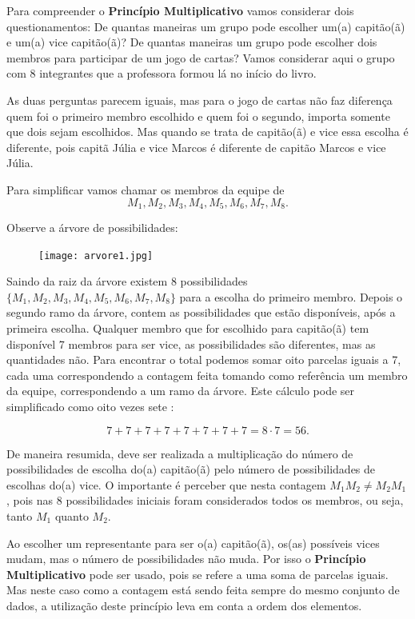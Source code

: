 Para compreender o \textbf{Princípio Multiplicativo} vamos considerar dois questionamentos: De quantas maneiras um grupo pode escolher um(a) capitão(ã) e um(a) vice capitão(ã)? De quantas maneiras um grupo pode escolher dois membros para participar de um jogo de cartas? Vamos considerar aqui o grupo com 8 integrantes que a professora formou lá no início do livro. 

As duas perguntas parecem iguais, mas para o jogo de cartas não faz diferença quem foi o primeiro membro escolhido e quem foi o segundo, importa somente que dois sejam escolhidos. Mas quando se trata de capitão(ã) e vice essa escolha é diferente, pois capitã Júlia e vice Marcos é diferente de capitão Marcos e vice Júlia. 

Para simplificar vamos chamar os membros da equipe de 
$$M_1, M_2, M_3, M_4, M_5, M_6, M_7, M_8.$$

Observe a árvore de possibilidades: 


\begin{figure}[H]
\centering

    \texttt{[image: arvore1.jpg]}
\end{figure}


Saindo da raiz da árvore existem 8 possibilidades $\{M_1, M_2, M_3, M_4, M_5, M_6, M_7, M_8\}$ para a escolha do primeiro membro. Depois o segundo ramo da árvore, contem as possibilidades que estão disponíveis, após a primeira escolha. Qualquer membro que for escolhido para capitão(ã) tem disponível 7 membros para ser vice, as possibilidades são diferentes, mas as quantidades não. Para encontrar o total podemos somar oito parcelas iguais a 7, cada uma correspondendo a contagem feita tomando como referência um membro da equipe, correspondendo a um ramo da árvore. Este cálculo pode ser simplificado como oito vezes sete :

$$7+7+7+7+7+7+7+7=  8 \cdot 7= 56.$$

De maneira resumida, deve ser realizada a multiplicação do número de possibilidades de escolha do(a) capitão(ã)  pelo número de possibilidades de escolhas do(a) vice. O importante é perceber que nesta contagem $M_1M_2  \neq M_2M_1$, pois nas 8 possibilidades iniciais foram considerados todos os membros, ou seja, tanto $M_1$ quanto $M_2$.  

Ao escolher um representante para ser o(a) capitão(ã), os(as) possíveis vices mudam, mas o número de possibilidades não muda. Por isso o \textbf{Princípio Multiplicativo} pode ser usado, pois se refere a uma soma de parcelas iguais. Mas neste caso como a contagem está sendo feita sempre do mesmo conjunto de dados, a utilização deste princípio leva em conta a ordem dos elementos.

